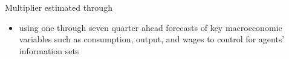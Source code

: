 



Multiplier estimated through
\begin{itemize}
    \item using one through seven quarter ahead forecasts of key macroeconomic variables such as consumption, output, and wages to control for agents' information sets \parencite{hall2023economic}
\end{itemize}




